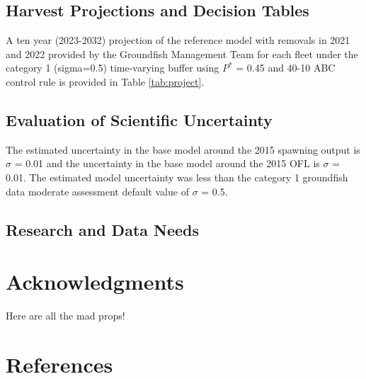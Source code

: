 \documentclass[11pt,
  english,
  letterpaper,
]{article}
\begin{document}
\hypertarget{harvest-projections-and-decision-tables}{%
\subsection{Harvest Projections and Decision Tables}\label{harvest-projections-and-decision-tables}}

A ten year (2023-2032) projection of the reference model with removals in 2021 and 2022 provided by the Groundfish Management Team for each fleet under the category 1 (sigma=0.5) time-varying buffer using \(P^*\) = 0.45 and 40-10 ABC control rule is provided in Table \ref{tab:project}.

\hypertarget{evaluation-of-scientific-uncertainty}{%
\subsection{Evaluation of Scientific Uncertainty}\label{evaluation-of-scientific-uncertainty}}

The estimated uncertainty in the base model around the 2015 spawning output is \(\sigma\) = 0.01 and the uncertainty in the base model around the 2015 OFL is \(\sigma\) = 0.01. The estimated model uncertainty was less than the category 1 groundfish data moderate assessment default value of \(\sigma\) = 0.5.

\hypertarget{research-and-data-needs-1}{%
\subsection{Research and Data Needs}\label{research-and-data-needs-1}}

\hypertarget{acknowledgments}{%
\section{Acknowledgments}\label{acknowledgments}}

Here are all the mad props!

\clearpage

\hypertarget{references}{%
\section{References}\label{references}}
\end{document}
